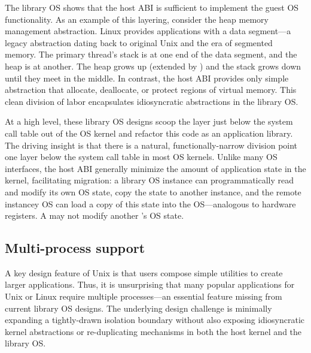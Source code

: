 The library OS shows that the host ABI is sufficient to implement the guest OS functionality.
As an example of this layering, consider the heap memory management abstraction. Linux provides applications with a data segment---a legacy abstraction dating back to original Unix and the era of segmented memory. The primary thread's stack is at one end of the data segment, and the heap is at another.  The heap grows up (extended by ) and the stack grows down until they meet in the middle.
In contrast, the host ABI provides only simple abstraction that allocate, deallocate, or protect regions of virtual memory.
This clean division of labor encapsulates idiosyncratic abstractions
in the library OS.



At a high level, these library OS designs
scoop the layer just below the system call table out of the OS kernel
and refactor this code as an application library.  
The driving insight is that there is a natural, functionally-narrow division point 
one layer below the system call table
in most OS kernels.
Unlike many OS interfaces, the host ABI generally minimize the amount of application state in the kernel, facilitating
migration: a library OS instance can programmatically read and modify its own OS state, copy the state to another instance, and the remote instancey OS can 
load a copy of this state into the OS---analogous to hardware registers.
A \picoproc{} may not modify another \picoproc{}'s OS state.



\subsection{Multi-process support}
\label{sec:overview:libos:multiproc}

A key design feature of Unix is that users compose simple utilities to create larger applications.  Thus, it is unsurprising that many popular applications for Unix or Linux require multiple processes---an essential feature missing from current library OS designs.
The underlying design challenge is minimally expanding a tightly-drawn isolation boundary without also exposing idiosyncratic kernel abstractions or re-duplicating mechanisms in both the host kernel and the library OS.


